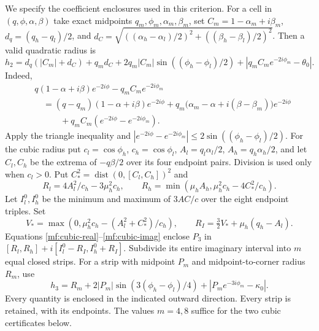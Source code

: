 We specify the coefficient enclosures used in this criterion.
For a cell in $(q,\phi,\alpha,\beta)$ take exact midpoints
$q_m,\phi_m,\alpha_m,\beta_m$, set
$C_m=1-\alpha_m+i\beta_m$,
$d_q=(q_h-q_l)/2$, and
$d_C=\sqrt{((\alpha_h-\alpha_l)/2)^2+
                ((\beta_h-\beta_l)/2)^2}$.
Then a valid quadratic radius is
\[
 h_2=d_q(|C_m|+d_C)+q_md_C
       +2q_m|C_m|\sin((\phi_h-\phi_l)/2)
       +|q_mC_me^{-2i\phi_m}-\theta_0|.
\]
Indeed,
\begin{align*}
 &q(1-\alpha+i\beta)e^{-2i\phi}-q_mC_me^{-2i\phi_m}\\
 &\quad=(q-q_m)(1-\alpha+i\beta)e^{-2i\phi}
       +q_m\bigl(\alpha_m-\alpha+i(\beta-\beta_m)\bigr)e^{-2i\phi}\\
 &\qquad\quad+q_mC_m(e^{-2i\phi}-e^{-2i\phi_m}).
\end{align*}
Apply the triangle inequality and
$|e^{-2i\phi}-e^{-2i\phi_m}|
 \le2\sin((\phi_h-\phi_l)/2)$.
For the cubic radius put $c_l=\cos\phi_h$, $c_h=\cos\phi_l$,
$A_l=q_l\alpha_l/2$, $A_h=q_h\alpha_h/2$, and let $C_l,C_h$
be the extrema of $-q\beta/2$ over its four endpoint pairs.
Division is used only when $c_l>0$. Put
$C_*^2=\operatorname{dist}(0,[C_l,C_h])^2$ and
\[
 R_l=4A_l^2/c_h-3\mu_h^2c_h,\qquad
 R_h=\min(\mu_hA_h,\mu_h^2c_h-4C_*^2/c_h).
\]
Let $I_l^0,I_h^0$ be the minimum and maximum of $3AC/c$
over the eight endpoint triples. Set
\[
 V_*=\max(0,\mu_h^2c_h-(A_l^2+C_*^2)/c_h),\qquad
 R_I=\tfrac32V_*+\mu_h(q_h-A_l).
\]
Equations \eqref{mf:cubic-real}--\eqref{mf:cubic-imag} enclose
$P_3$ in $[R_l,R_h]+i[I_l^0-R_I,I_h^0+R_I]$.
Subdivide its entire imaginary interval into $m$ equal closed
strips. For a strip with midpoint $P_m$ and midpoint-to-corner
radius $R_m$, use
\[
 h_3=R_m+2|P_m|\sin(3(\phi_h-\phi_l)/4)
                 +|P_me^{-3i\phi_m}-\kappa_0|.
\]
Every quantity is enclosed in the indicated outward direction.
Every strip is retained, with its endpoints. The values
$m=4,8$ suffice for the two cubic certificates below.

